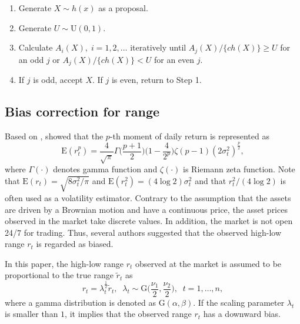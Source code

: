 \documentclass[11pt]{article}
\begin{document}
\begin{enumerate}
\item 
Generate $X \sim h(x)$ as a proposal.
\item 
Generate $U \sim \mathrm{U}(0,1)$.
\item 
Calculate $A_i(X), \; i=1, 2, \ldots$ iteratively until $A_j(X)/\{ch(X)\}\ge U$ for an odd $j$ or $A_j(X)/\{ch(X)\}< U$ for an even $j$.
\item 
If $j$ is odd, accept $X$. If $j$ is even, return to Step 1.
\end{enumerate}



\subsection{Bias correction for range}
Based on \cite{Feller(1951)}, \cite{Parkinson(1980)} showed that the $p$-th moment of daily return is represented as 
\begin{equation}
\mathrm{E}(r_t^p) =\frac{4}{\sqrt{\pi}} \Gamma\Big(\frac{p+1}{2}\Big) \Big( 1-\frac{4}{2^p} \Big) \zeta(p-1) (2\sigma^2_t)^{\frac{p}{2}}, 
\end{equation}
where $\Gamma(\cdot)$ denotes gamma function and $\zeta(\cdot)$ is Riemann zeta function. 
Note that $\mathrm{E}(r_t) =\sqrt{8\sigma^2_t/\pi}$ and $\mathrm{E}(r_t^2) =(4\log 2)\sigma^2_t$ and that $r_t^2/(4\log 2)$ is often used as a volatility estimator. 
Contrary to the assumption that the assets are driven by a Brownian motion and have a continuous price, the asset prices observed in the market take discrete values. 
In addition, the market is not open 24/7 for trading. 
Thus, several authors suggested that the observed high-low range $r_t$ is regarded as biased. 

In this paper, the high-low range $r_t$ observed at the market is assumed to be proportional to the true range $\widetilde{r}_t$ as
\begin{equation}
r_t =\lambda_t^{\frac{1}{2}} \widetilde{r}_t, \;\; \lambda_t \sim\mathrm{G}\Big(\frac{\nu_1}{2}, \frac{\nu_2}{2}\Big), \;\; t=1, \ldots, n,  
\end{equation}
where a gamma distribution is denoted as $\mathrm{G}(\alpha, \beta)$. 
If the scaling parameter $\lambda_t$ is smaller than $1$, it implies that the observed range $r_t$ has a downward bias. 
\end{document}
